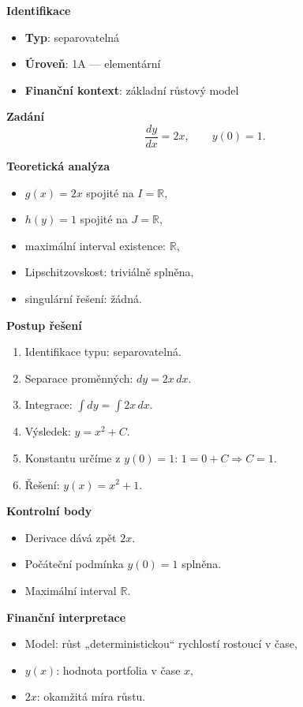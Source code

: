 \begin{example}
\label{ex:1a1}

\textbf{Identifikace}
\begin{itemize}
\item \textbf{Typ}: separovatelná
\item \textbf{Úroveň}: 1A — elementární
\item \textbf{Finanční kontext}: základní růstový model
\end{itemize}

\textbf{Zadání}
\[
\frac{dy}{dx} = 2x, \qquad y(0) = 1.
\]

\textbf{Teoretická analýza}
\begin{itemize}
\item $g(x)=2x$ spojité na $I=\mathbb{R}$,
\item $h(y)=1$ spojité na $J=\mathbb{R}$,
\item maximální interval existence: $\mathbb{R}$,
\item Lipschitzovskost: triviálně splněna,
\item singulární řešení: žádná.
\end{itemize}

\textbf{Postup řešení}
\begin{enumerate}
\item Identifikace typu: separovatelná.
\item Separace proměnných: $dy = 2x\,dx$.
\item Integrace: $\int dy = \int 2x\,dx$.
\item Výsledek: $y = x^2 + C$.
\item Konstantu určíme z $y(0)=1$: $1=0+C \Rightarrow C=1$.
\item Řešení: $y(x)=x^2+1$.
\end{enumerate}

\textbf{Kontrolní body}
\begin{itemize}
\item Derivace dává zpět $2x$.
\item Počáteční podmínka $y(0)=1$ splněna.
\item Maximální interval $\mathbb{R}$.
\end{itemize}

\textbf{Finanční interpretace}
\begin{itemize}
\item Model: růst „deterministickou“ rychlostí rostoucí v čase,
\item $y(x)$: hodnota portfolia v čase $x$,
\item $2x$: okamžitá míra růstu.
\end{itemize}


\end{example}
